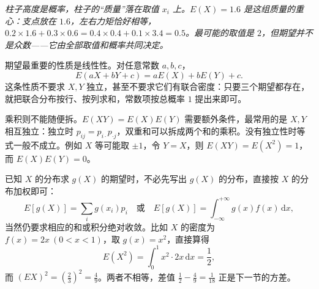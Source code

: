 \begin{center}
\par\vspace{2pt}
{\footnotesize\itshape 柱子高度是概率，柱子的“质量”落在取值 $x_i$ 上。$E(X)=1.6$ 是这组质量的重心：支点放在 $1.6$，左右力矩恰好相等，
$0.2\times1.6+0.3\times0.6=0.4\times0.4+0.1\times3.4=0.5$。最可能的取值是 $2$，但期望并不是众数——它由全部取值和概率共同决定。}
\end{center}

期望最重要的性质是线性性。对任意常数 $a,b,c$，
\[
E(aX+bY+c)=aE(X)+bE(Y)+c .
\]
这条性质不要求 $X,Y$ 独立，甚至不要求它们有联合密度：只要三个期望都存在，就把联合分布按行、按列求和，常数项按总概率 $1$ 提出来即可。

乘积则不能随便拆。$E(XY)=E(X)E(Y)$ 需要额外条件，最常用的是 $X,Y$ 相互独立：独立时 $p_{ij}=p_{i\cdot}p_{\cdot j}$，双重和可以拆成两个和的乘积。没有独立性时等式一般不成立。例如 $X$ 等可能取 $\pm1$，令 $Y=X$，则 $E(XY)=E(X^2)=1$，而 $E(X)E(Y)=0$。

已知 $X$ 的分布求 $g(X)$ 的期望时，不必先写出 $g(X)$ 的分布，直接按 $X$ 的分布加权即可：
\[
E[g(X)]=\sum_i g(x_i)p_i
\quad\text{或}\quad
E[g(X)]=\int_{-\infty}^{+\infty}g(x)f(x)\,\mathrm{d}x ,
\]
当然仍要求相应的和或积分绝对收敛。比如 $X$ 的密度为 $f(x)=2x\ (0<x<1)$，取 $g(x)=x^2$，直接算得
\[
E(X^2)=\int_0^1 x^2\cdot2x\,\mathrm{d}x=\frac12 ,
\]
而 $(E X)^2=\left(\frac23\right)^2=\frac49$。两者不相等，差值 $\frac12-\frac49=\frac1{18}$ 正是下一节的方差。

